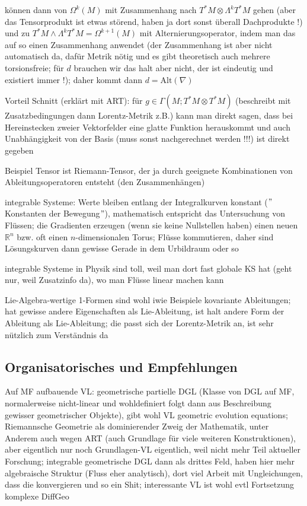 können dann von $\Omega^k(M)$ mit Zusammenhang nach $T^*M \otimes \Lambda^k T^*M$ gehen (aber das Tensorprodukt ist etwas störend, haben ja dort sonst überall Dachprodukte !) und zu $T^*M \wedge \Lambda^k T^*M = \Omega^{k + 1}(M)$ mit Alternierungsoperator, indem man das auf so einen Zusammenhang anwendet (der Zusammenhang ist aber nicht automatisch da, dafür Metrik nötig und es gibt theoretisch auch mehrere torsionsfreie; für $d$ brauchen wir das halt aber nicht, der ist eindeutig und existiert immer !); daher kommt dann $d = \text{Alt}(\nabla)$


Vorteil Schnitt (erklärt mit ART): für $g \in \Gamma(M; T^* M \otimes T^* M)$ (beschreibt mit Zusatzbedingungen dann Lorentz-Metrik z.B.) kann man direkt sagen, dass bei Hereinstecken zweier Vektorfelder eine glatte Funktion herauskommt und auch Unabhängigkeit von der Basis (muss sonst nachgerechnet werden !!!) ist direkt gegeben


Beispiel Tensor ist Riemann-Tensor, der ja durch geeignete Kombinationen von Ableitungsoperatoren entsteht (den Zusammenhängen)


integrable Systeme: Werte bleiben entlang der Integralkurven konstant ($"$Konstanten der Bewegung$"$), mathematisch entspricht das Untersuchung von Flüssen; die Gradienten erzeugen (wenn sie keine Nullstellen haben) einen neuen $\mathbb{R}^n$ bzw. oft einen $n$-dimensionalen Torus; Flüsse kommutieren, daher sind Lösungskurven dann gewisse Gerade in dem Urbildraum oder so

integrable Systeme in Physik sind toll, weil man dort fast globale KS hat (geht nur, weil Zusatzinfo da), wo man Flüsse linear machen kann

Lie-Algebra-wertige 1-Formen sind wohl iwie Beispiele kovariante Ableitungen; hat gewisse andere Eigenschaften als Lie-Ableitung, ist halt andere Form der Ableitung als Lie-Ableitung; die passt sich der Lorentz-Metrik an, ist sehr nützlich zum Verständnis da



		\subsection*{Organisatorisches und Empfehlungen}
Auf MF aufbauende VL: geometrische partielle DGL (Klasse von DGL auf MF, normalerweise nicht-linear und wohldefiniert folgt dann aus Beschreibung gewisser geometrischer Objekte), gibt wohl VL geometric evolution equations; Riemannsche Geometrie als dominierender Zweig der Mathematik, unter Anderem auch wegen ART (auch Grundlage für viele weiteren Konstruktionen), aber eigentlich nur noch Grundlagen-VL eigentlich, weil nicht mehr Teil aktueller Forschung; integrable geometrische DGL dann als drittes Feld, haben hier mehr algebraische Struktur (Fluss eher analytisch), dort viel Arbeit mit Ungleichungen, dass die konvergieren und so ein Shit; interessante VL ist wohl evtl Fortsetzung komplexe DiffGeo


